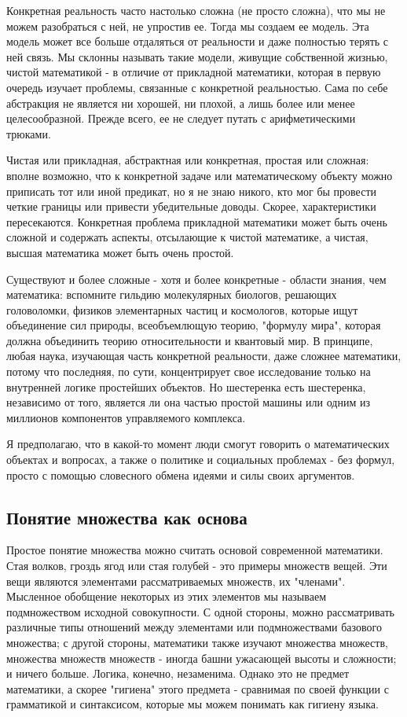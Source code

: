 Конкретная реальность часто настолько сложна (не просто сложна), что мы не можем разобраться с ней, не упростив ее. Тогда мы создаем ее модель. Эта модель может все больше отдаляться от реальности и даже полностью терять с ней связь. Мы склонны называть такие модели, живущие собственной жизнью, чистой математикой - в отличие от прикладной математики, которая в первую очередь изучает проблемы, связанные с конкретной реальностью. Сама по себе абстракция не является ни хорошей, ни плохой, а лишь более или менее целесообразной. Прежде всего, ее не следует путать с арифметическими трюками.

Чистая или прикладная, абстрактная или конкретная, простая или сложная: вполне возможно, что к конкретной задаче или математическому объекту можно приписать тот или иной предикат, но я не знаю никого, кто мог бы провести четкие границы или привести убедительные доводы. Скорее, характеристики пересекаются. Конкретная проблема прикладной математики может быть очень сложной и содержать аспекты, отсылающие к чистой математике, а чистая, высшая математика может быть очень простой.

Существуют и более сложные - хотя и более конкретные - области знания, чем математика: вспомните гильдию молекулярных биологов, решающих головоломки, физиков элементарных частиц и космологов, которые ищут объединение сил природы, всеобъемлющую теорию, "формулу мира", которая должна объединить теорию относительности и квантовый мир. В принципе, любая наука, изучающая часть конкретной реальности, даже сложнее математики, потому что последняя, по сути, концентрирует свое исследование только на внутренней логике простейших объектов. Но шестеренка есть шестеренка, независимо от того, является ли она частью простой машины или одним из миллионов компонентов управляемого комплекса.

Я предполагаю, что в какой-то момент люди смогут говорить о математических объектах и вопросах, а также о политике и социальных проблемах - без формул, просто с помощью словесного обмена идеями и силы своих аргументов.

\subsection{Понятие множества как основа}
Простое понятие множества можно считать основой современной математики. Стая волков, гроздь ягод или стая голубей - это примеры множеств вещей. Эти вещи являются элементами рассматриваемых множеств, их "членами". Мысленное обобщение некоторых из этих элементов мы называем подмножеством исходной совокупности.
С одной стороны, можно рассматривать различные типы отношений между элементами или подмножествами базового множества; с другой стороны, математики также изучают множества множеств, множества множеств множеств - иногда башни ужасающей высоты и сложности; и ничего больше.
Логика, конечно, незаменима. Однако это не предмет математики, а скорее "гигиена" этого предмета - сравнимая по своей функции с грамматикой и синтаксисом, которые мы можем понимать как гигиену языка.
